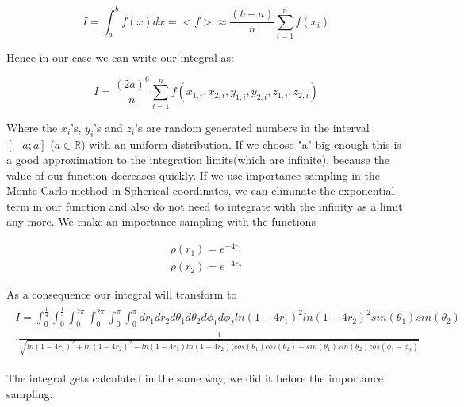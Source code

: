 \documentclass[10pt,a4paper]{article}
\begin{document}
\begin{equation}
I = \int_{a}^{b} f(x) dx = <f> \approx \frac{(b-a)}{n} \sum_{i=1}^{n} f(x_i)
\end{equation}

Hence in our case we can write our integral as:

\begin{equation}
	I = \frac{(2a)^6}{n} \sum_{i = 1}^n f(x_{1,i}, x_{2,i}, y_{1,i}, y_{2,i}, z_{1,i}, z_{2,i})
\end{equation}

Where the $x_i$'s, $y_i$'s and $z_i$'s are random generated numbers in the interval $[-a;a]$ ($a \in \mathbb{R}$) with an uniform distribution. If we choose "a" big enough this is a good approximation to the integration limits(which are infinite), because the value of our function decreases quickly. 
If we use importance sampling in the Monte Carlo method in Spherical coordinates, we can eliminate the exponential term in our function and also do not need to integrate with the infinity as a limit any more. We make an importance sampling with the functions

\begin{align}
\rho(r_1) = e^{-4 r_1} \\\rho(r_2) = e^{-4 r_2}
\end{align}

As a consequence our integral will transform to 
\begin{align}
\begin{split}
	    I = \int_0^\frac{1}{4} \int_0^\frac{1}{4}  \int_0^{2 \pi} \int_0^{2 \pi}  \int_0^\pi \int_0^\pi dr_1 dr_2 d\theta_1 d\theta_2 d\phi_1 d\phi_2    ln(1-4 r_1)^2 ln(1-4 r_2)^2 sin(\theta_1) sin(\theta_2)\\ \cdot \frac{1} {\sqrt{ln(1-4 r_1)^2+ln(1-4 r_2)^2-ln(1-4 r_1)ln(1-4 r_2)(cos(\theta_1)cos(\theta_2)+sin(\theta_1)sin(\theta_2)cos(\phi_1-\phi_2)}}
\end{split}
\end{align}

The integral gets calculated in the same way, we did it before the importance sampling.
\end{document}
